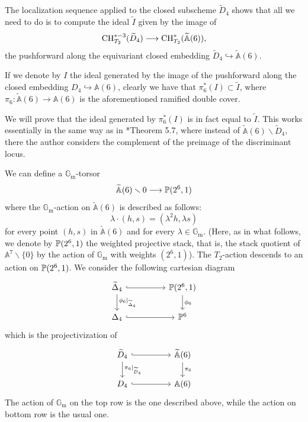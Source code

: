 \documentclass[a4paper, 10pt]{amsart}
\numberwithin{equation}{section}
\numberwithin{subsection}{section}
\theoremstyle{definition}
\theoremstyle{remark}
\renewcommand\AA{\mathbb{A}} \newcommand\BB{\mathbb{B}}
\newcommand\GG{\mathbb{G}} \newcommand\HH{\mathbb{H}}
\newcommand\rmm{\mathrm{m}} \newcommand\rmn{\mathrm{n}}
\renewcommand{\setminus}{\smallsetminus}
\newcommand{\gm}{\GG_{\rmm}}
\newcommand{\ch}[1][*]{\operatorname{CH}^{#1}}
\begin{document}
	The localization sequence applied to the closed subscheme $\widetilde{D}_4$ shows that all we need to do is to compute the ideal $\widetilde{I}$ given by the image of 
	\[{\rm{CH}}^{\ast -3}_{T_2}(\widetilde{D}_4) \longrightarrow \ch_{T_2}(\widetilde{\AA}(6)), \]
	the pushforward along the equivariant closed embedding $\widetilde{D}_4\hookrightarrow \widetilde{\AA}(6)$. 
	
	If we denote by $I$ the ideal generated by the image of the pushforward along the closed embedding $D_4 \hookrightarrow \AA(6)$, clearly we have that $\pi_6^*(I)\subset \widetilde{I}$, where $\pi_6\colon\widetilde{\AA}(6)\to\AA(6)$ is the aforementioned ramified double cover. 
	
	We will prove that the ideal generated by $\pi_6^*(I)$ is in fact equal to $\widetilde{I}$. This works essentially in the same way as in \cite{Per}*{Theorem 5.7}, where instead of $\widetilde{\AA}(6)\smallsetminus \widetilde{D}_4$, there the author considers the complement of the preimage of the discriminant locus.
	
	
	We can define a $\gm$-torsor 
	$$ \widetilde{\AA}(6)\setminus 0 \longrightarrow \PP(2^6,1) $$
	where the $\gm$-action on $\widetilde{\AA}(6)$ is described as follows:
	$$ \lambda\cdot (h,s)=(\lambda^2 h,\lambda s)$$ 
	for every point $(h,s)$ in $\widetilde{\AA}(6)$ and for every $\lambda \in \gm$. (Here, as in what follows, we denote by $\mathbb{P}(2^6,1)$ the weighted projective stack, that is, the stack quotient of $\AA^{7}\smallsetminus\{0\}$ by the action of $\gm$ with weights $(2^{6},1)$). The $T_2$-action descends to an action on $\mathbb{P}(2^6,1)$. We consider the following cartesian diagram
	$$ 
	\begin{tikzcd}
		\widetilde{\Delta}_4 \arrow[rr, hook] \arrow[d, "\phi_6\vert_{\widetilde{\Delta}_4}"] &  & {\PP(2^6,1)} \arrow[d, "\phi_6"] \\
		\Delta_4 \arrow[rr, hook]                                                          &  & \PP^6                        
	\end{tikzcd}
	$$
	which is the projectivization of
	$$ 
	\begin{tikzcd}
		\widetilde{D}_4 \arrow[rr, hook] \arrow[d, "\pi_6\vert_{\widetilde{D}_4}"] &  & \widetilde{\AA}(6) \arrow[d, "\pi_6"] \\
		D_4 \arrow[rr, hook]                                                          &  & \AA(6)                             
	\end{tikzcd}
	$$
	The action of $\gm$ on the top row is the one described above, while the action on bottom row is the usual one. 
	
\end{document}
